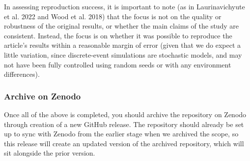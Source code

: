 In assessing reproduction success, it is important to note (as in Laurinavichyute et al. 2022\autocite{laurinavichyute_share_2022} and Wood et al. 2018\autocite{wood_push_2018}) that the focus is not on the quality or robustness of the original results, or whether the main claims of the study are consistent. Instead, the focus is on whether it was possible to reproduce the article's results within a reasonable margin of error (given that we do expect a little variation, since discrete-event simulations are stochastic models, and may not have been fully controlled using random seeds or with any environment differences).

\subsubsection{Archive on Zenodo}
\timeyes

Once all of the above is completed, you should archive the repository on Zenodo through creation of a new GitHub release. The repository should already be set up to sync with Zenodo from the earlier stage when we archived the scope, so this release will create an updated version of the archived repository, which will sit alongside the prior version.